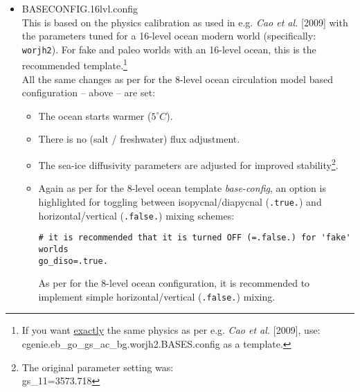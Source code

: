\documentclass[11pt,fleqn]{book} %
\begin{document}
\begin{itemize}[noitemsep]
\vspace{1mm}
\item \textsf{\small BASECONFIG.16lvl.config}
\vspace{1mm}
\\This is based on the physics calibration as used in e.g. \textit{Cao et al.} [2009] with the parameters tuned for a 16-level ocean modern world (specifically: \texttt{worjh2}). For fake and paleo worlds with an 16-level ocean, this is the recommended template.\footnote{If you want \uline{exactly} the same physics as per e.g. \textit{Cao et al.} [2009], use: \linebreak\textsf{\footnotesize cgenie.eb\_go\_gs\_ac\_bg.worjh2.BASES.config} as a template.}
\\All the same changes as per for the 8-level ocean circulation model based configuration -- above -- are set:
\begin{itemize}[noitemsep]
\vspace{1mm}
\item The ocean starts warmer (\(5^{\circ}C\)).
\vspace{1mm}
\item There is no (salt / freshwater) flux adjustment.
\vspace{1mm}
\item The sea-ice diffusivity parameters are adjusted for improved stability\footnote{The original parameter setting was:
\\gs\_11=3573.718}.
\end{itemize}
\vspace{1mm}

\begin{itemize}[noitemsep]
\vspace{1mm}
\item
Again as per for the 8-level ocean template \textit{base-config}, an option is highlighted for toggling between isopycnal/diapycnal (\texttt{.true.}) and horizontal/vertical (\texttt{.false.}) mixing schemes:
\small\vspace{-2pt}\begin{verbatim}
# it is recommended that it is turned OFF (=.false.) for 'fake' worlds
go_diso=.true.
\end{verbatim}\vspace{-2pt}\normalsize
As per for the 8-level ocean configuration, it is recommended to implement simple horizontal/vertical (\texttt{.false.}) mixing.
\end{itemize}


\end{itemize}
\end{document}
